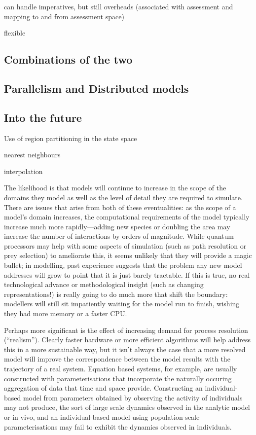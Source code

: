 can handle imperatives, but still overheads (associated with
assessment and mapping to and from assessment space)

flexible


\subsection{Combinations of the two}

\subsection{Parallelism and Distributed models}




\subsection{Into the future}

Use of region partitioning in the state space

nearest neighbours

interpolation






The likelihood is that models will continue to increase in the scope
of the domains they model as well as the level of detail they are
required to simulate.  There are issues that arise from both of these
eventualities: as the scope of a  model's domain increases, the computational
requirements of the model typically increase much more rapidly---adding new
species or doubling the area may increase the number of interactions
by orders of magnitude. While quantum processors may help with some
aspects of simulation (such as path resolution or prey selection) to 
ameliorate this, it seems unlikely that they will provide a magic
bullet; in modelling, past experience suggests that the problem any new model
addresses will grow to point that it is just barely tractable. If this is
true, no real technological advance or methodological insight (such as
changing representations!) is really going to do much more that shift
the boundary: modellers will still sit impatiently waiting for the
model run to finish, wishing they had more memory or a faster CPU.

Perhaps more significant is the effect of increasing demand for
process resolution (``realism'').  Clearly faster hardware or more
efficient algorithms will help address this in a more sustainable way,
but it isn't always the case that a more resolved model will improve
the correspondence between the model results with the trajectory of a
real system.  Equation based systems, for example, are usually
constructed with parameterisations that incorporate the naturally
occuring aggregation of data that time and space provide.
Constructing an individual-based model from parameters obtained by
observing the activity of individuals may not produce, the sort of
large scale dynamics observed in the analytic model or in vivo, and an
individual-based model using population-scale parameterisations may
fail to exhibit the dynamics observed in individuals.


